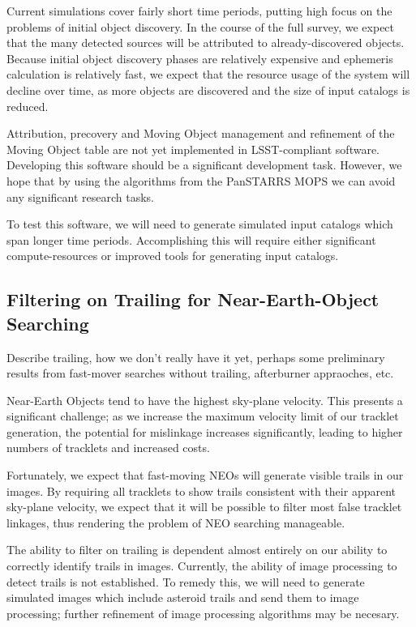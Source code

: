 \documentclass[12pt,preprint]{aastex}
\begin{document}
Current simulations cover fairly short time periods, putting high
focus on the problems of initial object discovery.  In the course of
the full survey, we expect that the many detected sources will be
attributed to already-discovered objects.  Because initial object
discovery phases are relatively expensive and ephemeris calculation is
relatively fast, we expect that the resource usage of the system will
decline over time, as more objects are discovered and the size of
input catalogs is reduced.

Attribution, precovery and Moving Object management and refinement of the
Moving Object table are not yet implemented in LSST-compliant software.
Developing this software should be a significant development task.
However, we hope that by using the algorithms from the PanSTARRS MOPS
we can avoid any significant research tasks.

To test this software, we will need to generate simulated input
catalogs which span longer time periods.  Accomplishing this will
require either significant compute-resources or improved tools for
generating input catalogs.



\subsection{Filtering on Trailing for Near-Earth-Object Searching}

Describe trailing, how we don't really have it yet, perhaps some
preliminary results from fast-mover searches without trailing,
afterburner appraoches, etc.

Near-Earth Objects tend to have the highest sky-plane velocity.  This
presents a significant challenge; as we increase the maximum velocity
limit of our tracklet generation, the potential for mislinkage
increases significantly, leading to higher numbers of tracklets and
increased costs.  

Fortunately, we expect that fast-moving NEOs will generate visible
trails in our images.  By requiring all tracklets to show trails
consistent with their apparent sky-plane velocity, we expect that it
will be possible to filter most false tracklet linkages, thus
rendering the problem of NEO searching manageable.

The ability to filter on trailing is dependent almost entirely on our
ability to correctly identify trails in images.  Currently, the
ability of image processing to detect trails is not established.  To
remedy this, we will need to generate simulated images which include
asteroid trails and send them to image processing; further refinement
of image processing algorithms may be necesary.
\end{document}
